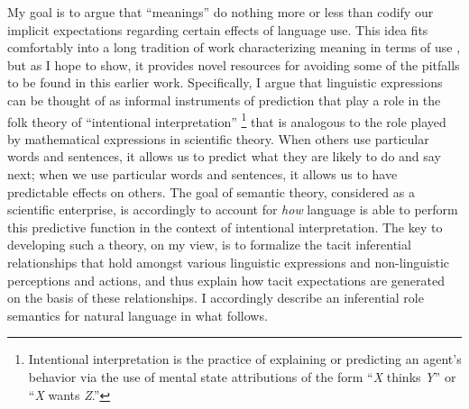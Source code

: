 My goal is to argue that ``meanings'' do nothing more or less than codify our implicit expectations regarding certain effects of language use. This idea fits comfortably into a long tradition of work characterizing meaning in terms of use \citep{Sellars:1954,Wittgenstein:1953,Sellars:1953,Harman:1982,Block:1986,Brandom:1994,Brandom:2000,Brandom:2009,Horwich:2005}, but as I hope to show, it provides novel resources for avoiding some of the pitfalls to be found in this earlier work. Specifically, I argue that linguistic expressions can be thought of as informal instruments of prediction that play a role in the folk theory of ``intentional interpretation'' \citep{Dennett:1987,Brandom:1994}\footnote{Intentional interpretation is the practice of explaining or predicting an agent's behavior via the use of mental state attributions of the form ``\textit{X} thinks \textit{Y}'' or ``\textit{X} wants \textit{Z}.''} that is analogous to the role played by mathematical expressions in scientific theory. When others use particular words and sentences, it allows us to predict what they are likely to do and say next; when we use particular words and sentences, it allows us to have predictable effects on others. The goal of semantic theory, considered as a scientific enterprise, is accordingly to account for \textit{how} language is able to perform this predictive function in the context of intentional interpretation. The key to developing such a theory, on my view, is to formalize the tacit inferential relationships that hold amongst various linguistic expressions and non-linguistic perceptions and actions, and thus explain how tacit expectations are generated on the basis of these relationships. I accordingly describe an inferential role semantics for natural language in what follows. 

